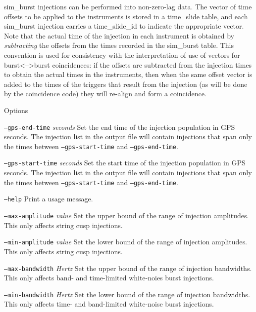 \documentclass[10pt]{article}
\newcommand{\option}[1]{\texttt{#1}}
\newcommand{\parm}[1]{\textit{#1}}
\newenvironment{entry}%
{\begin{list}{}{\renewcommand{\makelabel}[1]%
{\parbox[b]{\labelwidth}{\makebox[0pt][l]{\textbf{##1}}\\}}%
\setlength{\labelwidth}{1em}%
\setlength{\labelsep}{1em}%
\setlength{\leftmargin}{2em}%
\setlength{\topsep}{\medskipamount}%
\setlength{\itemsep}{\medskipamount}%
\setlength{\parsep}{\medskipamount}%
\setlength{\listparindent}{0pt}}}
{\end{list}}
\begin{document}
\begin{entry}
sim\_burst injections can be performed into non-zero-lag data.  The vector
of time offsets to be applied to the instruments is stored in a time\_slide
table, and each sim\_burst injection carries a time\_slide\_id to indicate
the appropriate vector.  Note that the actual time of the injection in each
instrument is obtained by \emph{subtracting} the offsets from the times
recorded in the sim\_burst table.  This convention is used for consistency
with the interpretation of use of vectors for burst<-->burst coincidences:
if the offsets are subtracted from the injection times to obtain the actual
times in the instruments, then when the same offset vector is added to the
times of the triggers that result from the injection (as will be done by
the coincidence code) they will re-align and form a coincidence.

\item[Options]\leavevmode
\begin{entry}
\item[\option{--gps-end-time} \parm{seconds}]
Set the end time of the injection population in GPS seconds.  The injection
list in the output file will contain injections that span only the times
between \option{--gps-start-time} and \option{--gps-end-time}.

\item[\option{--gps-start-time} \parm{seconds}]
Set the start time of the injection population in GPS seconds.  The
injection list in the output file will contain injections that span only
the times between \option{--gps-start-time} and \option{--gps-end-time}.

\item[\option{--help}]
Print a usage message.

\item[\option{--max-amplitude} \parm{value}]
Set the upper bound of the range of injection amplitudes.  This only
affects string cusp injections.

\item[\option{--min-amplitude} \parm{value}]
Set the lower bound of the range of injection amplitudes.  This only
affects string cusp injections.

\item[\option{--max-bandwidth} \parm{Hertz}]
Set the upper bound of the range of injection bandwidths.  This only
affects band- and time-limited white-noies burst injections.

\item[\option{--min-bandwidth} \parm{Hertz}]
Set the lower bound of the range of injection bandwidths.  This only
affects time- and band-limited white-noise burst injections.


\end{entry}
\end{entry}
\end{document}
